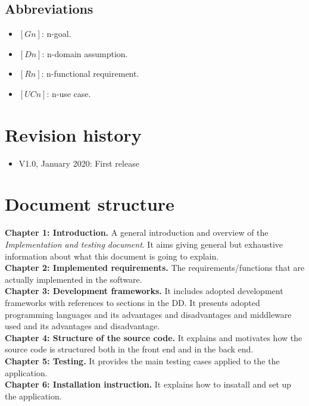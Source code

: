 \documentclass[../ITD.tex]{subfiles}
\begin{document}
    \subsection{Abbreviations}\label{subsec:abbreviations}
    \begin{itemize}
        \item $[Gn]$: n-goal.
        \item $[Dn]$: n-domain assumption.
        \item $[Rn]$: n-functional requirement.
        \item $[UCn]$: n-use case.
    \end{itemize}
    \newpage
    \section{Revision history}\label{sec:revision-history}
    \begin{itemize}
        \item V1.0, January  2020: First release
    \end{itemize}
    \section{Document structure}\label{sec:document-structure}
    \textbf{Chapter 1: Introduction.}
    A general introduction and overview of the \textit{Implementation and testing document}. It aims giving general but exhaustive information about what this document is going to explain.
    \\
    \textbf{Chapter 2: Implemented requirements.} The requirements/functions that are actually implemented in the software.
    \\
    \textbf{Chapter 3: Development frameworks.}  It includes adopted development frameworks with references to sections in the DD. It presents adopted programming languages and its advantages and disadvantages and middleware used and its advantages and disadvantage.
    \\
    \textbf{Chapter 4: Structure of the source code.} It explains and motivates how the source code is structured both in the front end and in the back end.
    \\
    \textbf{Chapter 5: Testing.} It provides the main testing cases applied to the the application.
    \\
    \textbf{Chapter 6: Installation instruction.} It explains how to insatall and set up the application.
\end{document}
